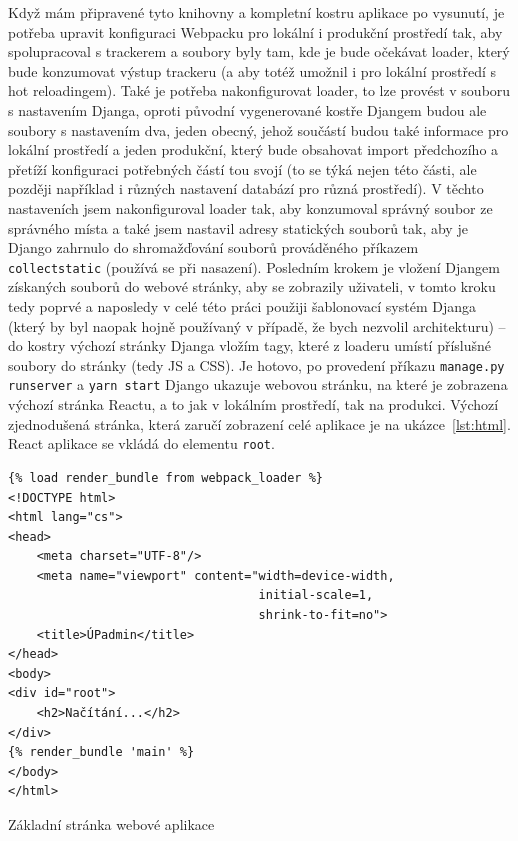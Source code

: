     Když mám připravené tyto knihovny a kompletní kostru aplikace po vysunutí, je potřeba upravit konfiguraci Webpacku pro lokální i produkční prostředí tak, aby spolupracoval s trackerem a soubory byly tam, kde je bude očekávat loader, který bude konzumovat výstup trackeru (a aby totéž umožnil i pro lokální prostředí s hot reloadingem). Také je potřeba nakonfigurovat loader, to lze provést v souboru s nastavením Djanga, oproti původní vygenerované kostře Djangem budou ale soubory s nastavením dva, jeden obecný, jehož součástí budou také informace pro lokální prostředí a jeden produkční, který bude obsahovat import předchozího a přetíží konfiguraci potřebných částí tou svojí (to se týká nejen této části, ale později například i různých nastavení databází pro různá prostředí). V těchto nastaveních jsem nakonfiguroval loader tak, aby konzumoval správný soubor ze správného místa a také jsem nastavil adresy statických souborů tak, aby je Django zahrnulo do shromažďování souborů prováděného příkazem \verb|collectstatic| (používá se při nasazení). Posledním krokem je vložení Djangem získaných souborů do webové stránky, aby se zobrazily uživateli, v tomto kroku tedy poprvé a naposledy v celé této práci použiji šablonovací systém Djanga (který by byl naopak hojně používaný v případě, že bych nezvolil architekturu) -- do kostry výchozí stránky Djanga vložím tagy, které z loaderu umístí příslušné soubory do stránky (tedy JS a CSS). Je hotovo, po provedení příkazu \verb|manage.py runserver| a \verb|yarn start| Django ukazuje webovou stránku, na které je zobrazena výchozí stránka Reactu, a to jak v lokálním prostředí, tak na produkci. Výchozí zjednodušená stránka, která zaručí zobrazení celé aplikace je na ukázce~\ref{lst:html}. React aplikace se vkládá do elementu \verb|root|.
    
    \begin{listing}[ht]
    	\begin{verbatim}
{% load render_bundle from webpack_loader %}
<!DOCTYPE html>
<html lang="cs">
<head>
    <meta charset="UTF-8"/>
    <meta name="viewport" content="width=device-width,
                                   initial-scale=1,
                                   shrink-to-fit=no">
    <title>ÚPadmin</title>
</head>
<body>
<div id="root">
    <h2>Načítání...</h2>
</div>
{% render_bundle 'main' %}
</body>
</html>
    	\end{verbatim}
    	\caption{Základní stránka webové aplikace}\label{lst:html}
    \end{listing}
    

